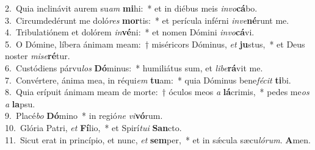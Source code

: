 {2.~}Quia inclinávit aurem su\textit{am} \textbf{mi}hi:~* et in diébus meis \textit{in}\textit{vo}\textbf{cá}bo.\\
{3.~}Circumdedérunt me doló\textit{res} \textbf{mor}tis:~* et perícula inférni \textit{in}\textit{ve}\textbf{né}runt me.\\
{4.~}Tribulatiónem et dolórem \textit{in}\textbf{vé}ni:~* et nomen Dómini \textit{in}\textit{vo}\textbf{cá}vi.\\
{5.~}O Dómine, líbera ánimam meam:~† miséricors Dóminus, \textit{et} \textbf{ju}stus,~* et Deus noster \textit{mi}\textit{se}\textbf{ré}tur.\\
{6.~}Custódiens párvu\textit{los} \textbf{Dó}minus:~* humiliátus sum, et \textit{li}\textit{be}\textbf{rá}vit me.\\
{7.~}Convértere, ánima mea, in réqui\textit{em} \textbf{tu}am:~* quia Dóminus bene\textit{fé}\textit{cit} \textbf{ti}bi.\\
{8.~}Quia erípuit ánimam meam de morte:~† óculos meos \textit{a} \textbf{lá}crimis,~* pedes me\textit{os} \textit{a} \textbf{la}psu.\\
{9.~}Placé\textit{bo} \textbf{Dó}mino~* in regió\textit{ne} \textit{vi}\textbf{vó}rum.\\
{10.~}Glória Patri, \textit{et} \textbf{Fí}lio,~* et Spirí\textit{tu}\textit{i} \textbf{San}cto.\\
{11.~}Sicut erat in princípio, et nunc, \textit{et} \textbf{sem}per,~* et in sǽcula sæcu\textit{ló}\textit{rum}. \textbf{A}men.\\
